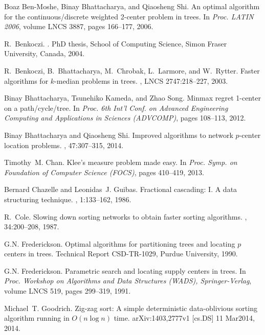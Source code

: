 \documentclass{llncs}
\begin{document}
{\begin{thebibliography}{10}
Boaz Ben-Moshe, Binay Bhattacharya, and Qiaosheng Shi.
\newblock An optimal algorithm for the continuous/discrete weighted 2-center
  problem in trees.
\newblock In {\em Proc. LATIN 2006}, volume LNCS 3887, pages 166--177, 2006.

R.~Benkoczi.
.
\newblock PhD thesis, School of Computing Science, Simon Fraser University,
  Canada, 2004.

R.~Benkoczi, B.~Bhattacharya, M.~Chrobak, L.~Larmore, and W.~Rytter.
\newblock Faster algorithms for $k$-median problems in trees.
,
  LNCS 2747:218--227, 2003.

Binay Bhattacharya, Tsunehiko Kameda, and Zhao Song.
\newblock Minmax regret 1-center on a path/cycle/tree.
\newblock In {\em Proc. 6th Int'l Conf. on Advanced Engineering Computing and
  Applications in Sciences (ADVCOMP)}, pages 108--113, 2012.

Binay Bhattacharya and Qiaosheng Shi.
\newblock Improved algorithms to network $p$-center location problems.
, 47:307--315, 2014.

Timothy~M. Chan.
\newblock Klee's measure problem made easy.
\newblock In {\em Proc. Symp. on Foundation of Computer Science (FOCS)}, pages
  410--419, 2013.

Bernard Chazelle and Leonidas~J. Guibas.
\newblock Fractional cascading: {I. A} data structuring technique.
, 1:133--162, 1986.

R.~Cole.
\newblock Slowing down sorting networks to obtain faster sorting algorithms.
, 34:200--208, 1987.

G.N. Frederickson.
\newblock Optimal algorithms for partitioning trees and locating $p$ centers in
  trees.
\newblock Technical Report CSD-TR-1029, Purdue University, 1990.

G.N. Frederickson.
\newblock Parametric search and locating supply centers in trees.
\newblock In {\em Proc. Workshop on Algorithms and Data Structures (WADS),
  Springer-Verlag}, volume LNCS 519, pages 299--319, 1991.

Michael~T. Goodrich.
\newblock Zig-zag sort: A simple deterministic data-oblivious sorting algorithm
  running in ${O}(n\log n)$ time.
\newblock arXiv:1403,2777v1 [cs.DS] 11 Mar2014, 2014.


\end{thebibliography}}
\end{document}
